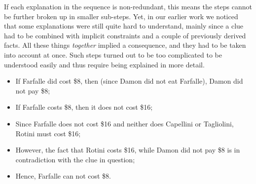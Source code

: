 If each explanation in the sequence is non-redundant, this means the steps cannot be further broken up in smaller sub-steps. 
Yet, in our earlier work we noticed that some explanations were still quite hard to understand, mainly since a clue had to be combined with implicit constraints and a couple of previously derived facts. All these things \textit{together} implied a consequence, and they had to be taken into account at once.
Such steps turned out to be too complicated to be understood easily and thus require being explained in more detail.

 \begin{itemize}
  \item If Farfalle did cost \$8, then (since Damon did not eat Farfalle), Damon did not pay \$8;
  \item If Farfalle costs \$8, then it does not cost \$16; 
  \item Since Farfalle does not cost \$16 and neither does Capellini or Tagliolini, Rotini must cost \$16;
  \item However, the fact that Rotini costs \$16, while Damon did not pay \$8 is in contradiction with the clue in question;
  \item Hence, Farfalle can not cost \$8.
 \end{itemize}



